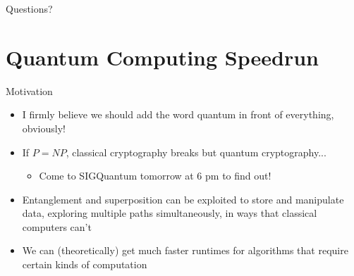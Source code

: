 \documentclass[aspectratio=169, handout]{beamer}
\begin{document}



\begin{frame}{}
      \begin{center}
    {\color{sigma@mainblue} \LARGE Questions?}
  \end{center}
\end{frame}

\section{Quantum Computing Speedrun}
\frame{\sectionpage}

\begin{frame}{Motivation}
    \begin{itemize}
        \item I firmly believe we should add the word quantum in front of everything, obviously! \pause
        \item If $P = NP$, classical cryptography breaks but quantum cryptography... \pause
        \begin{itemize}
            \item Come to SIGQuantum tomorrow at 6 pm to find out! \pause
        \end{itemize}
        \item Entanglement and superposition can be exploited to store and manipulate data, exploring multiple paths simultaneously, in ways that classical computers can't \pause
        \item We can (theoretically) get much faster runtimes for algorithms that require certain kinds of computation
    \end{itemize}
\end{frame}
\end{document}
